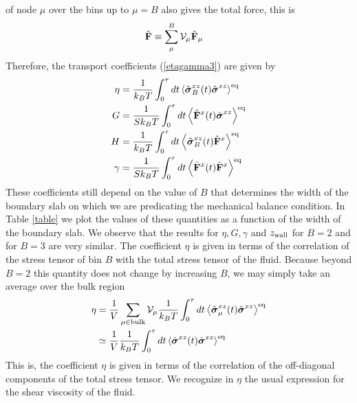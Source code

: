 \documentclass[b5paper,openright,10pt]{book}
\begin{document}
of node $\mu$ over the bins up  to $\mu=B$ also gives the total force,
this is
\begin{align}
  \hat{\bf F}&\equiv \sum_\mu^B{\cal V}_\mu\hat{\bf F}_\mu
\end{align}
Therefore, the transport coefficients (\ref{etagamma3}) are given by
\begin{align}
\eta&= \frac{1}{k_BT}\int_0^{\tau} dt
\left\langle  \hat{\boldsymbol{\sigma}}^{xz}_{B}(t) \hat{\boldsymbol{\sigma}}^{xz}\right\rangle^{\rm eq}
\nonumber\\
G &=   \frac{1}{Sk_BT}\int_0^{\tau} dt
\left\langle  \hat{\bf F}^{x}(t) \hat{\boldsymbol{\sigma}}^{xz}\right\rangle^{\rm eq}
\nonumber\\
H &=   \frac{1}{k_BT}\int_0^{\tau} dt
\left\langle  \hat{\boldsymbol{\sigma}}^{xz}_{B}(t) \hat{\bf F}^{x}\right\rangle^{\rm eq}
\nonumber\\
\gamma&= 
\frac{1}{Sk_BT}\int_0^{\tau} dt
\left\langle  \hat{\bf F}^{x}(t)\hat{\bf F}^{x}\right\rangle^{\rm eq}
\label{FinMic}
\end{align}
These coefficients  still depend on  the value of $B$  that determines
the  width of  the  boundary  slab on  which  we  are predicating  the
mechanical balance condition.  In Table \ref{table} we plot the values
of these quantities as a function  of the width of the boundary slab.
We observe that the results for $\eta,G,\gamma$ and $z_{\rm wall}$ for
$B=2$ and for $B=3$ are very similar.  The coefficient $\eta$ is given
in terms of the  correlation of the stress tensor of  bin $B$ with the
total stress tensor of the  fluid.  Because beyond $B=2$ this quantity
does not change by increasing $B$,  we may simply take an average over
the bulk region
\begin{align}
  \eta&= \frac{1}{V}\sum_{\mu\in{\rm bulk}}{\cal V}_\mu \frac{1}{k_BT}\int_0^{\tau} dt
\left\langle  \hat{\boldsymbol{\sigma}}^{xz}_{\mu}(t) \hat{\boldsymbol{\sigma}}^{xz}\right\rangle^{\rm eq}
\nonumber\\
&\simeq \frac{1}{V}\frac{1}{k_BT}\int_0^{\tau} dt
\left\langle  \hat{\boldsymbol{\sigma}}^{xz}(t) \hat{\boldsymbol{\sigma}}^{xz}\right\rangle^{\rm eq}
\end{align}
This is, the  coefficient $\eta$ is given in terms  of the correlation
of  the  off-diagonal  components  of the  total  stress  tensor.   We
recognize in  $\eta$ the usual  expression for the shear  viscosity of
the fluid.  
\end{document}
